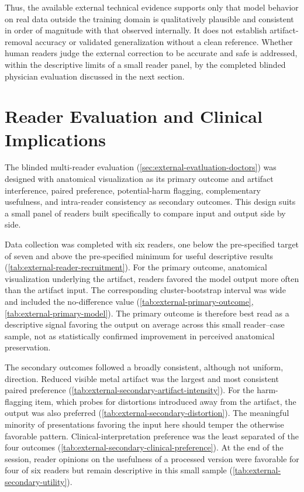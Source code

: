 Thus, the available external technical evidence supports only that model behavior on real data outside the training domain is qualitatively plausible and consistent in order of magnitude with that observed internally. It does not establish artifact-removal accuracy or validated generalization without a clean reference. Whether human readers judge the external correction to be accurate and safe is addressed, within the descriptive limits of a small reader panel, by the completed blinded physician evaluation discussed in the next section.

\section{Reader Evaluation and Clinical Implications}

The blinded multi-reader evaluation (\autoref{sec:external-evatluation-doctors}) was designed with anatomical visualization as its primary outcome and artifact interference, paired preference, potential-harm flagging, complementary usefulness, and intra-reader consistency as secondary outcomes. This design suits a small panel of readers built specifically to compare input and output side by side.

Data collection was completed with six readers, one below the pre-specified target of seven and above the pre-specified minimum for useful descriptive results (\autoref{tab:external-reader-recruitment}). For the primary outcome, anatomical visualization underlying the artifact, readers favored the model output more often than the artifact input. The corresponding cluster-bootstrap interval was wide and included the no-difference value (\autoref{tab:external-primary-outcome}, \autoref{tab:external-primary-model}). The primary outcome is therefore best read as a descriptive signal favoring the output on average across this small reader--case sample, not as statistically confirmed improvement in perceived anatomical preservation.

The secondary outcomes followed a broadly consistent, although not uniform, direction. Reduced visible metal artifact was the largest and most consistent paired preference (\autoref{tab:external-secondary-artifact-intensity}). For the harm-flagging item, which probes for distortions introduced away from the artifact, the output was also preferred (\autoref{tab:external-secondary-distortion}). The meaningful minority of presentations favoring the input here should temper the otherwise favorable pattern. Clinical-interpretation preference was the least separated of the four outcomes (\autoref{tab:external-secondary-clinical-preference}). At the end of the session, reader opinions on the usefulness of a processed version were favorable for four of six readers but remain descriptive in this small sample (\autoref{tab:external-secondary-utility}).

